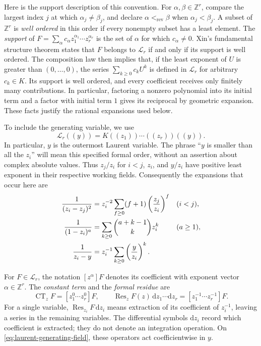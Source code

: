 \documentclass[reqno, 12pt]{article}
\numberwithin{equation}{section}
\theoremstyle{definition}
\DeclareMathOperator{\CT}{CT}
\DeclareMathOperator{\Res}{Res}
\newcommand{\ZZ}{\mathbb Z}
\newcommand{\dd}{\mathrm d}
\begin{document}
Here is the support description of this convention.  For $\alpha,\beta\in\ZZ^r$, compare the largest index $j$ at which
$\alpha_j\ne\beta_j$, and declare $\alpha<_{\mathrm{rev}}\beta$ when $\alpha_j<\beta_j$.
A subset of $\ZZ^r$ is \emph{well ordered} in this order if every nonempty subset has a least element.  The \emph{support} of
$F=\sum_\alpha c_\alpha z_1^{\alpha_1}\cdots z_r^{\alpha_r}$
is the set of $\alpha$ for which $c_\alpha\ne0$. Xin's fundamental structure theorem
\cite[Proposition~2-1.2, p.~60]{XinThesis} states that $F$ belongs to $\mathcal L_r$ if and only if its support is well ordered.
The composition law \cite[Theorem~3-1.7, p.~113]{XinThesis} then implies that, if the least exponent of $U$ is greater than
$(0,\ldots,0)$, the series $\sum_{k\geq0}c_kU^k$ is defined in $\mathcal L_r$ for arbitrary $c_k\in K$.  Its support is well
ordered, and every coefficient receives only finitely many contributions.  In particular, factoring a nonzero polynomial
into its initial term and a factor with initial term $1$ gives its reciprocal by geometric expansion.  These facts justify the
rational expansions used below.


To include the generating variable, we use
\begin{equation}\label{eq:laurent-generating-field}
\mathcal L_r((y))=K((z_1))\cdots((z_r))((y)).
\end{equation}
In particular, $y$ is the outermost Laurent variable.  The phrase
``$y$ is smaller than all the $z_i$'' will mean this specified
formal order, without an assertion about complex absolute values.
Thus $z_j/z_i$ for $i<j$, $z_i$, and $y/z_i$ have positive least
exponent in their respective working fields.  Consequently the
expansions that occur here are
\begin{align}
\frac1{(z_i-z_j)^2}&=z_i^{-2}\sum_{f\geq0}(f+1)\left(\frac{z_j}{z_i}\right)^f&&(i<j),\label{eq:edge-expansion}\\
\frac1{(1-z_i)^a}&=\sum_{k\geq0}\binom{a+k-1}{k}z_i^k &&(a\geq1),\notag\\
\frac1{z_i-y}&=z_i^{-1}\sum_{k\geq0}\left(\frac y{z_i}\right)^k.\notag
\end{align}

For $F\in\mathcal L_r$, the notation $[z^\alpha]F$ denotes its coefficient with exponent vector $\alpha\in\ZZ^r$.
The \emph{constant term} and the \emph{formal residue} are
\[\CT_z F=[z_1^0\cdots z_r^0]F,\qquad
\Res_z F(z)\,\dd z_1\cdots\dd z_r=[z_1^{-1}\cdots z_r^{-1}]F.
\]
For a single variable, $\Res_{z_i}F\,\dd z_i$ means extraction of its coefficient of $z_i^{-1}$, leaving a series in the
remaining variables.  The differential symbols $\dd z_i$ record which coefficient is extracted; they do not denote an
integration operation.  On \eqref{eq:laurent-generating-field}, these operators act coefficientwise in $y$.
\end{document}
